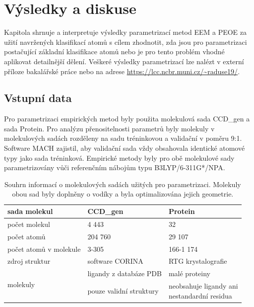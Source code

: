 \chapter{Výsledky a diskuse}
Kapitola shrnuje a interpretuje výsledky parametrizací metod EEM a PEOE za užití navržených klasifikací atomů s cílem zhodnotit, zda jsou pro parametrizaci postačující základní klasifikace atomů nebo je pro tento problém vhodné aplikovat detailnější dělení. Veškeré výsledky parametrizací lze nalézt v externí příloze bakalářské práce nebo na adrese \url{https://lcc.ncbr.muni.cz/~raduse19/}.  

\section{Vstupní data}
Pro parametrizaci empirických metod byly použita molekulová sada CCD\_gen a sada Protein. Pro analýzu přenositelnosti parametrů byly molekuly v molekulových sadách rozděleny na sadu tréninkovou a validační v poměru 9:1. Software MACH zajistil, aby validační sada vždy obsahovala identické atomové typy jako sada tréninková. Empirické metody byly pro obě molekulové sady parametrizovány vůči referenčním nábojům typu B3LYP/6-311G*/NPA.
\begin{table}[h]
    \renewcommand{\arraystretch}{1.35}
    \centering
    \begin{tabular}{l|l|l}
         sada molekul &  \textbf{CCD\_gen}\footnotemark
         & \textbf{Protein}\\
         \hline
         počet molekul & 4 443 & 32\\
         počet atomů & 204 760 & 29 107\\
         počet atomů v molekule & 3-305 & 166-1 174 \\
         zdroj struktur & software CORINA & RTG krystalografie \\
         \hline
         \multirow{2}{8em}{molekuly} & 
            ligandy z databáze PDB & malé proteiny\\
         & pouze validní struktury & \makecell[l]{neobsahuje ligandy ani \\nestandardní residua}
    \end{tabular}
    \caption{Souhrn informací o molekulových sadách užitých pro parametrizaci. Molekuly obou sad byly doplněny o vodíky a byla optimalizována jejich geometrie.}
    \label{moleculesets}
\end{table}
